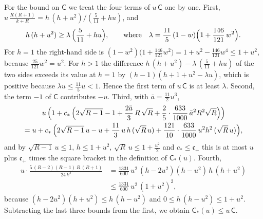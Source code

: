 \documentclass{amsart}
\theoremstyle{definition}
\theoremstyle{remark}
\numberwithin{equation}{section}
\begin{document}
For the bound on $\mathsf{C}$ we treat the four terms of $u\,\mathsf{C}$ one by one. First, $u\,\frac{R(R+1)}{k+R}=h\,(h+u^2)/(\frac{5}{11}+hu)$, and
\[
h\,(h+u^2)\ge\lambda\,\Bigl(\frac{5}{11}+hu\Bigr),\qquad\text{where}\quad\lambda=\frac{11}{5}\,(1-w)\Bigl(1+\frac{146}{121}\,w^2\Bigr).
\]
For $h=1$ the right-hand side is $(1-w^2)\bigl(1+\frac{146}{121}w^2\bigr)=1+u^2-\frac{146}{121}w^4\le 1+u^2$, because $\frac{25}{121}w^2=u^2$. For $h>1$ the difference $h\,(h+u^2)-\lambda\,(\frac{5}{11}+hu)$ of the two sides exceeds its value at $h=1$ by $(h-1)(h+1+u^2-\lambda u)$, which is positive because $\lambda u\le\frac{11}{5}u<1$. Hence the first term of $u\,\mathsf{C}$ is at least $\lambda$. Second, the term $-1$ of $\mathsf{C}$ contributes $-u$. Third, with $\bar a=\frac{11}{2}u^3$,
\begin{multline*}
u\,\Bigl(1+c_\ast\,\Bigl(2\sqrt{R-1}-1+\frac{2\bar a}{3}\,R\,\sqrt R+\frac25\cdot\frac{633}{1000}\,\bar a^{2}R^{2}\sqrt R\Bigr)\Bigr)\\
=u+c_\ast\,\Bigl(2\sqrt{R-1}\,u-u+\frac{11}{3}\,u\,h\,(\sqrt R\,u)+\frac{121}{10}\cdot\frac{633}{1000}\,u^2h^2\,(\sqrt R\,u)\Bigr),
\end{multline*}
and by $\sqrt{R-1}\,u\le 1$, $h\le 1+u^2$, $\sqrt R\,u\le 1+\frac{u^2}{2}$ and $c_\ast\le\mathfrak{c}_+$ this is at most $u$ plus $\mathfrak{c}_+$ times the square bracket in the definition of $\mathsf{C}_{*}(u)$. Fourth,
\begin{align*}
u\cdot\frac{5\,(R-2)(R-1)\,R\,(R+1)}{24\,k^3}&=\frac{1331}{600}\,u^2\,(h-2u^2)(h-u^2)\,h\,(h+u^2)\\
&\le\frac{1331}{600}\,u^2\,(1+u^2)^2,
\end{align*}
because $(h-2u^2)(h+u^2)\le h\,(h-u^2)$ and $0\le h\,(h-u^2)\le 1+u^2$. Subtracting the last three bounds from the first, we obtain $\mathsf{C}_{*}(u)\le u\,\mathsf{C}$.
\end{document}
